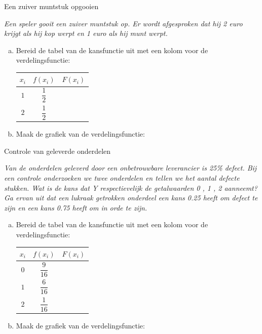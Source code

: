 \documentclass[12pt,twoside]{article}
\begin{document}
\begin{oefening}
Een zuiver muntstuk opgooien

{\em Een speler gooit een zuiver muntstuk op. Er wordt afgesproken dat hij 2 euro krijgt als hij kop werpt en 1 euro als hij munt werpt.}

\begin{enumerate}[(a)]
  \itemsep1em
  \item Bereid de tabel van de kansfunctie uit met een kolom voor de verdelingsfunctie:
  \begin{center}
    \begin{tabular}{c|c|c}
      $x_i$ & $f(x_i)$ & $F(x_i)$\\
      \hline
      $1$ & $\dfrac{1}{2}$ &\\
      $2$ & $\dfrac{1}{2}$ &\\
    \end{tabular}
  \end{center}
  \item Maak de grafiek van de verdelingsfunctie:
  \begin{center}
  \end{center}
\end{enumerate}
\end{oefening}

\begin{oefening} Controle van geleverde onderdelen

{\em Van de onderdelen geleverd door een onbetrouwbare leverancier is 25\% defect. Bij een controle onderzoeken we twee onderdelen en tellen we het aantal defecte stukken. Wat is de kans dat Y respectievelijk de getalwaarden 0 , 1 , 2 aanneemt? Ga ervan uit dat een lukraak getrokken onderdeel een kans 0.25 heeft om defect te zijn en een kans 0.75 heeft om in orde te zijn.}

\begin{enumerate}[(a)]
  \itemsep1em
  \item Bereid de tabel van de kansfunctie uit met een kolom voor de verdelingsfunctie:
  \begin{center}
    \begin{tabular}{c|c|c}
      $x_i$ & $f(x_i)$ & $F(x_i)$\\
      \hline
      $0$ & $\dfrac{9}{16}$ &\\
      $1$ & $\dfrac{6}{16}$ &\\
      $2$ & $\dfrac{1}{16}$ &\\
    \end{tabular}
  \end{center}
  \item Maak de grafiek van de verdelingsfunctie:
  \begin{center}
  \end{center}
\end{enumerate}
\end{oefening}
\end{document}
